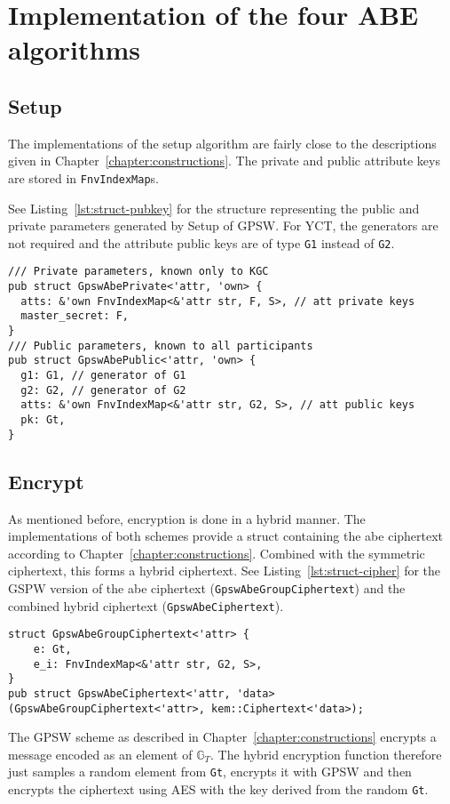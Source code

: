 \section{Implementation of the four ABE algorithms}
\subsection{Setup}
The implementations of the setup algorithm are fairly close to the descriptions given in Chapter~\ref{chapter:constructions}.
The private and public attribute keys are stored in \texttt{FnvIndexMap}s.

See Listing~\ref{lst:struct-pubkey} for the structure representing the public and private parameters generated by Setup of GPSW.
For YCT, the generators are not required and the attribute public keys are of type \texttt{G1} instead of \texttt{G2}.

\begin{lstlisting}[caption={Private and public system parameters structs for GPSW},label={lst:struct-pubkey}]
/// Private parameters, known only to KGC
pub struct GpswAbePrivate<'attr, 'own> {
  atts: &'own FnvIndexMap<&'attr str, F, S>, // att private keys
  master_secret: F,
}
/// Public parameters, known to all participants
pub struct GpswAbePublic<'attr, 'own> {
  g1: G1, // generator of G1
  g2: G2, // generator of G2
  atts: &'own FnvIndexMap<&'attr str, G2, S>, // att public keys
  pk: Gt,
}
\end{lstlisting}

\subsection{Encrypt}
As mentioned before, encryption is done in a hybrid manner.
The implementations of both schemes provide a struct containing the \acrshort{abe} ciphertext according to Chapter~\ref{chapter:constructions}.
Combined with the symmetric ciphertext, this forms a hybrid ciphertext.
See Listing~\ref{lst:struct-cipher} for the GSPW version of the \acrshort{abe} ciphertext (\verb+GpswAbeGroupCiphertext+) and the combined hybrid ciphertext (\verb+GpswAbeCiphertext+).

\begin{lstlisting}[caption={ABE ciphertext structure for GPSW},label={lst:struct-cipher}, breaklines=true]
struct GpswAbeGroupCiphertext<'attr> {
    e: Gt, 
    e_i: FnvIndexMap<&'attr str, G2, S>,
}
pub struct GpswAbeCiphertext<'attr, 'data>(GpswAbeGroupCiphertext<'attr>, kem::Ciphertext<'data>);
\end{lstlisting}
The GPSW scheme as described in Chapter~\ref{chapter:constructions} encrypts a message encoded as an element of $\mathbb{G}_T$.
The hybrid encryption function therefore just samples a random element from \texttt{Gt}, encrypts it with GPSW and then encrypts the ciphertext using AES with the key derived from the random \texttt{Gt}.

